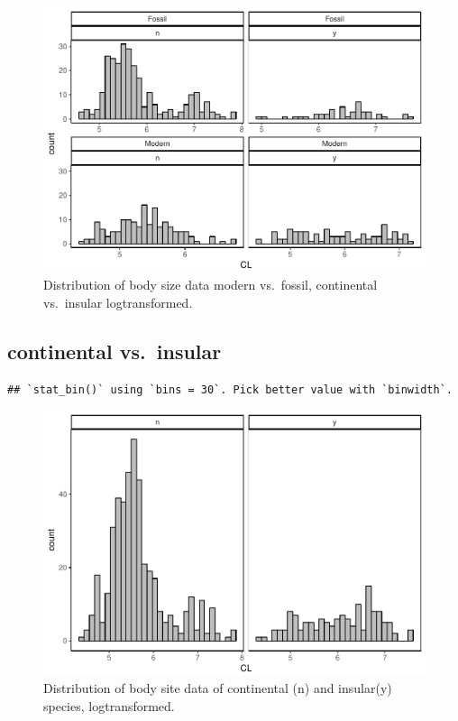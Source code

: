 \documentclass[]{article}
\begin{document}
\begin{figure}[htbp]
\centering
\includegraphics{MA_JJ_files/figure-latex/Histograms of body size data, modern vs. fossil, continental vs. insular-1.pdf}
\caption{Distribution of body size data modern vs.~fossil, continental
vs.~insular logtransformed.}
\end{figure}

\newpage

\subsection{continental vs.~insular}\label{continental-vs.insular}

\begin{verbatim}
## `stat_bin()` using `bins = 30`. Pick better value with `binwidth`.
\end{verbatim}

\begin{figure}[htbp]
\centering
\includegraphics{MA_JJ_files/figure-latex/Histograms of body size data, continental vs. insular-1.pdf}
\caption{Distribution of body site data of continental (n) and
insular(y) species, logtransformed.}
\end{figure}
\end{document}
